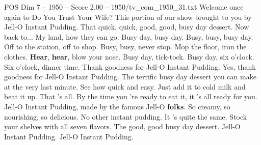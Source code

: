 \begin{textsample}{POS Dim 7 – 1950 – Score 2.00 – 1950/tv\_com\_1950\_31.txt}  \label{ex:f7_pos_013}
Welcome once again to Do You Trust Your Wife?
This portion of our show brought to you by Jell-O Instant Pudding.
That quick, quick, good, good, busy day dessert.
Now back to...
My land, how they can go.
Busy day, busy day.
Busy, busy, busy day.
Off to the station, off to shop.
Busy, busy, never stop.
Mop the floor, iron the clothes. \textbf{Hear}, \textbf{hear}, blow your nose.
Busy day, tick-tock.
Busy day, six o'clock.
Six o'clock, dinner time.
Thank goodness for Jell-O Instant Pudding.
Yes, thank goodness for Jell-O Instant Pudding.
The terrific busy day dessert you can make at the very last minute.
See how quick and easy.
Just add it to cold milk and beat it up.
That 's all.
By the time you 're ready to eat it, it 's all ready for you.
Jell-O Instant Pudding, made by the famous Jell-O \textbf{folks}.
So creamy, so nourishing, so delicious.
No other instant pudding.
It 's quite the same.
Stock your shelves with all seven flavors.
The good, good busy day dessert.
Jell-O Instant Pudding.
Jell-O Instant Pudding.

\end{textsample}
